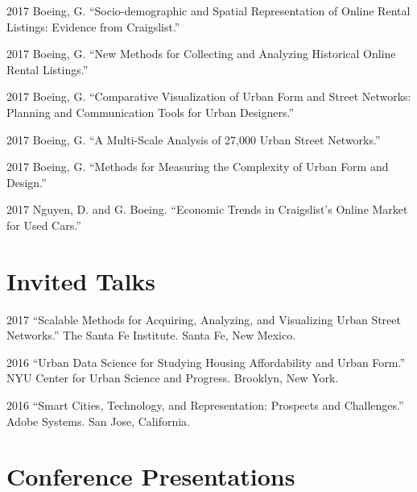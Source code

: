 \documentclass{mycv}
\begin{document}
\begin{tablist}

\item[2017] \tab Boeing, G. \enquote{Socio-demographic and Spatial Representation of Online Rental Listings: Evidence from Craigslist.}

\item[2017] \tab Boeing, G. \enquote{New Methods for Collecting and Analyzing Historical Online Rental Listings.}

\item[2017] \tab Boeing, G. \enquote{Comparative Visualization of Urban Form and Street Networks: Planning and Communication Tools for Urban Designers.}

\item[2017] \tab Boeing, G. \enquote{A Multi-Scale Analysis of 27,000 Urban Street Networks.}

\item[2017] \tab Boeing, G. \enquote{Methods for Measuring the Complexity of Urban Form and Design.}

\item[2017] \tab Nguyen, D. and G. Boeing. \enquote{Economic Trends in Craigslist's Online Market for Used Cars.}

\end{tablist}



\section*{Invited Talks}

\begin{tablist}

\item[2017] \tab \enquote{Scalable Methods for Acquiring, Analyzing, and Visualizing Urban Street Networks.} The Santa Fe Institute. Santa Fe, New Mexico.

\item[2016] \tab \enquote{Urban Data Science for Studying Housing Affordability and Urban Form.} NYU Center for Urban Science and Progress. Brooklyn, New York.

\item[2016] \tab \enquote{Smart Cities, Technology, and Representation: Prospects and Challenges.} Adobe Systems. San Jose, California.

\end{tablist}



\section*{Conference Presentations}
\end{document}
